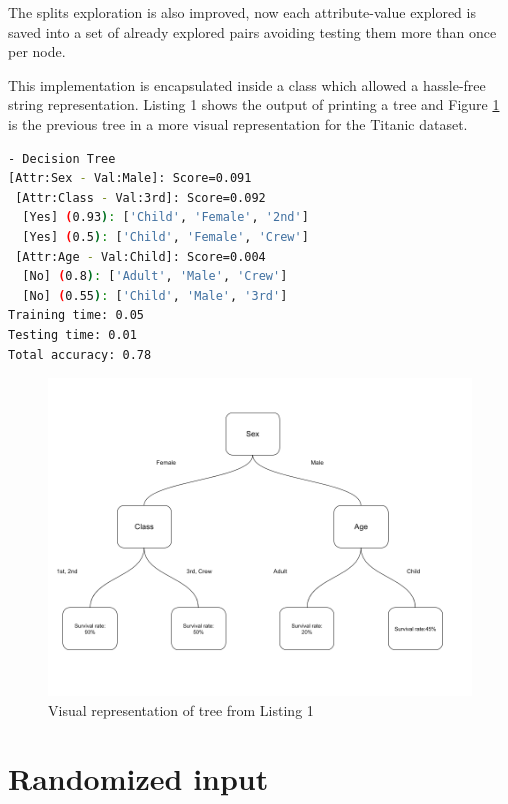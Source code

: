 \documentclass[a4paper,10pt]{article}
\begin{document}
The splits exploration is also improved, now each attribute-value explored is saved into a set of already explored pairs avoiding testing them more than once per node.

This implementation is encapsulated inside a class which allowed a hassle-free string representation. Listing 1 shows the output of printing a tree and Figure \ref{fig:tree} is the previous tree in a more visual representation for the Titanic dataset. 

\begin{lstlisting}[language=bash,caption={String representation of a decision tree with a maximum of 2 and at least one element per node for the Titanic dataset. As expected, the most important factor is sex. The next two are belonging to 3rd class vs. the rest and age (child vs. adults)}]
- Decision Tree
[Attr:Sex - Val:Male]: Score=0.091
 [Attr:Class - Val:3rd]: Score=0.092
  [Yes] (0.93): ['Child', 'Female', '2nd']
  [Yes] (0.5): ['Child', 'Female', 'Crew']
 [Attr:Age - Val:Child]: Score=0.004
  [No] (0.8): ['Adult', 'Male', 'Crew']
  [No] (0.55): ['Child', 'Male', '3rd']
Training time: 0.05
Testing time: 0.01
Total accuracy: 0.78
\end{lstlisting}

\begin{figure}[htpb]
\centering
\includegraphics[keepaspectratio, width=15cm]{images/tree.png}
\caption{Visual representation of tree from Listing 1}
\label{fig:tree}
\end{figure} 

\section{Randomized input}
\end{document}
